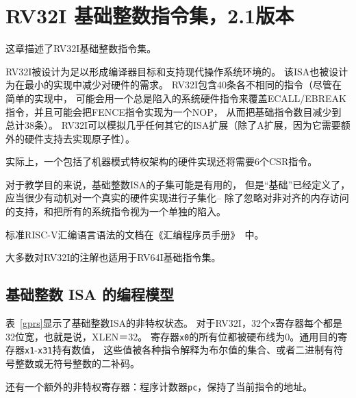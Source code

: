 \chapter{RV32I 基础整数指令集，2.1版本}
\label{rv32}

这章描述了RV32I基础整数指令集。

\begin{commentary}
RV32I被设计为足以形成编译器目标和支持现代操作系统环境的。
该ISA也被设计为在最小的实现中减少对硬件的需求。
RV32I包含40条各不相同的指令（尽管在简单的实现中，
可能会用一个总是陷入的系统硬件指令来覆盖ECALL/EBREAK指令，并且可能会把FENCE指令实现为一个NOP，
从而把基础指令数目减少到总计38条）。
RV32I可以模拟几乎任何其它的ISA扩展（除了A扩展，因为它需要额外的硬件支持去实现原子性）。

实际上，一个包括了机器模式特权架构的硬件实现还将需要6个CSR指令。

对于教学目的来说，基础整数ISA的子集可能是有用的，
但是“基础”已经定义了，应当很少有动机对一个真实的硬件实现进行子集化--
除了忽略对非对齐的内存访问的支持，和把所有的系统指令视为一个单独的陷入。
\end{commentary}

\begin{commentary}
标准RISC-V汇编语言语法的文档在《汇编程序员手册》~\cite{riscv-asm-manual}中。
\end{commentary}

\begin{commentary}
大多数对RV32I的注解也适用于RV64I基础指令集。
\end{commentary}

\section{基础整数 ISA 的编程模型}

表~\ref{gprs}显示了基础整数ISA的非特权状态。
对于RV32I，32个{\tt x}寄存器每个都是32位宽，也就是说，XLEN＝32。
寄存器{\tt x0}的所有位都被硬布线为0。通用目的寄存器{\tt x1}-{\tt x31}持有数值，
这些值被各种指令解释为布尔值的集合、或者二进制有符号整数或无符号整数的二补码。

还有一个额外的非特权寄存器：程序计数器{\tt pc}，保持了当前指令的地址。


